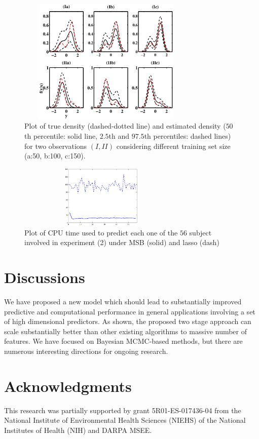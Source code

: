 \documentclass{article}
\begin{document}
\begin{figure}
\centering
\includegraphics[width=85mm,height=60mm]{densityestimate.eps}
\caption{Plot of true density (dashed-dotted line) and estimated density ($50$th percentile: solid line, $2.5$th and $97.5$th percentiles: dashed lines) for two observations $(I, II)$ considering different training set size (a:50, b:100, c:150). } \label{plotDensity}
\end{figure}

\begin{figure}
\centering
\includegraphics[width=80mm,height=30mm]{Time_real.eps}
\caption{Plot of CPU time used to predict each one of the $56$ subject involved in experiment (2) under MSB (solid) and lasso (dash)} \label{fig:real}
\end{figure}


\section*{Discussions}
We have proposed a new model which should lead to substantially improved predictive and computational performance in general applications involving a set of high dimensional predictors. As shown, the proposed two stage approach can scale substantially better than other existing algorithms to massive number of features. We have focused on Bayesian MCMC-based methods, but there are numerous interesting directions for ongoing research.

\section*{Acknowledgments}
This research was partially supported by grant 5R01-ES-017436-04 from the National Institute of Environmental Health Sciences (NIEHS) of the National Institutes of Health (NIH) and DARPA MSEE.




\end{document}
